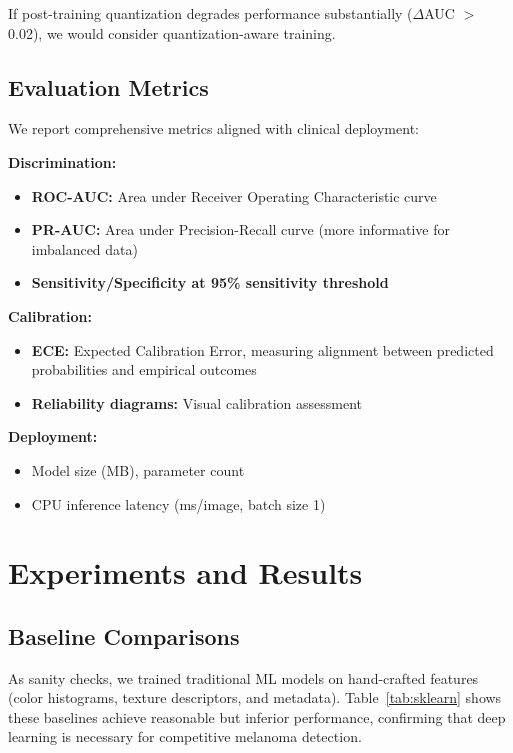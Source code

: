 \documentclass[conference]{IEEEtran}
\begin{document}
If post-training quantization degrades performance substantially ($\Delta$AUC $>$ 0.02), we would consider quantization-aware training.

\subsection{Evaluation Metrics}

We report comprehensive metrics aligned with clinical deployment:

\textbf{Discrimination:}
\begin{itemize}
    \item \textbf{ROC-AUC:} Area under Receiver Operating Characteristic curve
    \item \textbf{PR-AUC:} Area under Precision-Recall curve (more informative for imbalanced data)
    \item \textbf{Sensitivity/Specificity at 95\% sensitivity threshold}
\end{itemize}

\textbf{Calibration:}
\begin{itemize}
    \item \textbf{ECE:} Expected Calibration Error, measuring alignment between predicted probabilities and empirical outcomes
    \item \textbf{Reliability diagrams:} Visual calibration assessment
\end{itemize}

\textbf{Deployment:}
\begin{itemize}
    \item Model size (MB), parameter count
    \item CPU inference latency (ms/image, batch size 1)
\end{itemize}

\section{Experiments and Results}

\subsection{Baseline Comparisons}

As sanity checks, we trained traditional ML models on hand-crafted features (color histograms, texture descriptors, and metadata). Table~\ref{tab:sklearn} shows these baselines achieve reasonable but inferior performance, confirming that deep learning is necessary for competitive melanoma detection.
\end{document}
